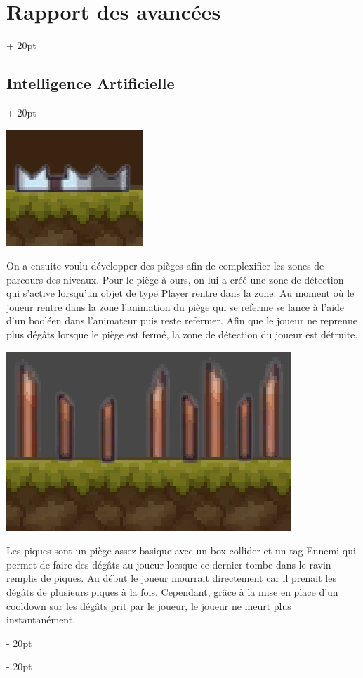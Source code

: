 \documentclass[a4paper, 12pt, twoside]{article}
\newcommand{\ind}[1][20pt]{\advance\leftskip + #1}
\newcommand{\deind}[1][20pt]{\advance\leftskip - #1}
\newenvironment{indt}[2][20pt]{#2 \par \ind[#1]}{\par \deind} %
\begin{document}
\begin{indt}{\section{Rapport des avancées}}
\begin{indt}{\subsection{Intelligence Artificielle}}
            \begin{center}
                \includegraphics[width=0.5\linewidth]{piege_a_ours.png}
            \end{center}

            On a ensuite voulu développer des pièges afin de complexifier les zones de parcours des niveaux. Pour le piège à ours, on lui a créé une zone de détection qui s'active lorsqu'un objet de type Player rentre dans la zone.  Au moment où le joueur rentre dans la zone l'animation du piège qui se referme se lance à l'aide d'un booléen dans l'animateur puis reste refermer. Afin que le joueur ne reprenne plus dégâts lorsque le piège est fermé, la zone de détection du joueur est détruite. 
        
            \begin{center}
                \includegraphics[width=0.5\linewidth]{pique.png}
            \end{center}

            Les piques sont un piège assez basique avec un box collider et un tag Ennemi qui permet de faire des dégâts au joueur lorsque ce dernier tombe dans le ravin remplis de piques. Au début le joueur mourrait directement car il prenait les dégâts de plusieurs piques à la fois. Cependant, grâce à la mise en place d'un cooldown sur les dégâts prit par le joueur, le joueur ne meurt plus instantanément.
            
        \end{indt}


\end{indt}
\end{document}
